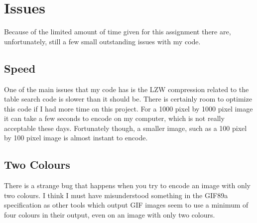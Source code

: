 \documentclass[11pt]{article} %
\begin{document}
\section{Issues}
Because of the limited amount of time given for this assignment there are, unfortunately, still a few small outstanding issues with my code.
\subsection{Speed}
One of the main issues that my code has is the LZW compression related to the table search code is slower than it should be. There is certainly room to optimize this code if I had more time on this project. For a 1000 pixel by 1000 pixel image it can take a few seconds to encode on my computer, which is not really acceptable these days. Fortunately though, a smaller image, such as a 100 pixel by 100 pixel image is almost instant to encode.
\subsection{Two Colours}
There is a strange bug that happens when you try to encode an image with only two colours. I think I must have misunderstood something in the GIF89a specification as other tools which output GIF images seem to use a minimum of four colours in their output, even on an image with only two colours.
\end{document}
